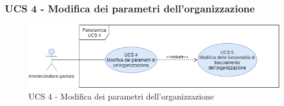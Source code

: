 \subsubsection{UCS 4 - Modifica dei parametri dell'organizzazione}%

\begin{figure}[h]
	\centering	
	\includegraphics[scale=0.53]{sezioni/UseCase/Immagini/UCS4.png}
	\caption{UCS 4 - Modifica dei parametri dell'organizzazione}
\end{figure}

